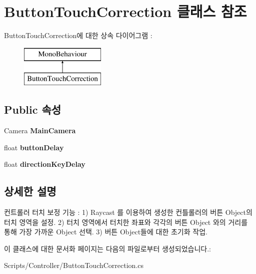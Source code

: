 \hypertarget{class_button_touch_correction}{}\section{Button\+Touch\+Correction 클래스 참조}
\label{class_button_touch_correction}
Button\+Touch\+Correction에 대한 상속 다이어그램 \+: \begin{figure}[H]
\begin{center}
\leavevmode
\includegraphics[height=2.000000cm]{class_button_touch_correction}
\end{center}
\end{figure}
\subsection*{Public 속성}
\begin{DoxyCompactItemize}
\item 
\hypertarget{class_button_touch_correction_a19ea503527449b5da9e7050f7f5acf5a}{}Camera {\bfseries Main\+Camera}\label{class_button_touch_correction_a19ea503527449b5da9e7050f7f5acf5a}

\item 
\hypertarget{class_button_touch_correction_a9761d21fb49dc6aada74bcc25c8fda7a}{}float {\bfseries button\+Delay}\label{class_button_touch_correction_a9761d21fb49dc6aada74bcc25c8fda7a}

\item 
\hypertarget{class_button_touch_correction_ab5c0016695133ad13615e0df46fe8fe0}{}float {\bfseries direction\+Key\+Delay}\label{class_button_touch_correction_ab5c0016695133ad13615e0df46fe8fe0}

\end{DoxyCompactItemize}


\subsection{상세한 설명}
컨트롤러 터치 보정 기능 \+: 1) Raycast 를 이용하여 생성한 컨틀롤러의 버튼 Object의 터치 영역을 설정. 2) 터치 영역에서 터치한 좌표와 각각의 버튼 Object 와의 거리를 통해 가장 가까운 Object 선택. 3) 버튼 Object들에 대한 초기화 작업. 

이 클래스에 대한 문서화 페이지는 다음의 파일로부터 생성되었습니다.\+:\begin{DoxyCompactItemize}
\item 
Scripts/\+Controller/Button\+Touch\+Correction.\+cs\end{DoxyCompactItemize}
